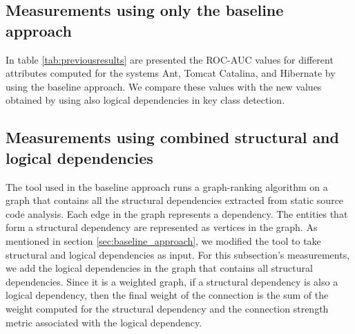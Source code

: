 \documentclass[runningheads]{comsis2}
\begin{document}
\subsection{Measurements using only the baseline approach}
\label{sec:measure_baseline}

In table \ref{tab:previousresults} are presented the ROC-AUC values for different attributes computed for the systems Ant, Tomcat Catalina, and Hibernate by using the baseline approach. We compare these values with the new values obtained by using also logical dependencies in key class detection.

\begin{table}
\renewcommand{\arraystretch}{1}
\caption{ROC-AUC metric values extracted. }
\label{tab:previousresults}
\centering
{}
\end{table}


\subsection{Measurements using combined structural and logical dependencies}
\label{sec:measure_ld_sd}

The tool used in the baseline approach runs a graph-ranking algorithm on a graph that contains all the structural dependencies extracted from static source code analysis.
Each edge in the graph represents a dependency. The entities that form a structural dependency are represented as vertices in the graph. 
As mentioned in section \ref{sec:baseline_approach}, we modified the tool to take structural and logical dependencies as input.
For this subsection's measurements, we add the logical dependencies in the graph that contains all structural dependencies. Since it is a weighted graph, if a structural dependency is also a logical dependency, then the final weight of the connection is the sum of the weight computed for the structural dependency and the connection strength metric associated with the logical dependency.
\end{document}
